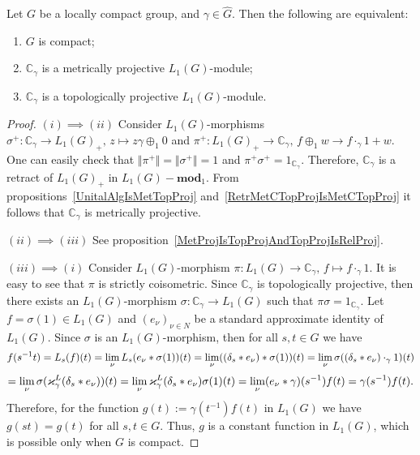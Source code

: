 \begin{proposition}\label{OneDimL1ModMetTopProjCharac} Let $G$ be a locally 
compact group, and $\gamma\in\widehat{G}$. Then the following are equivalent:

\begin{enumerate}[label = (\roman*)]
    \item $G$ is compact;

    \item $\mathbb{C}_\gamma$ is a metrically projective $L_1(G)$-module;

    \item $\mathbb{C}_\gamma$ is a topologically projective $L_1(G)$-module.
\end{enumerate}
\end{proposition}
\begin{proof} $(i)\implies (ii)$ Consider $L_1(G)$-morphisms 
$\sigma^+:\mathbb{C}_\gamma\to {L_1(G)}_+,\, z\mapsto z\gamma \oplus_1 0$ 
and $\pi^+:{L_1(G)}_+\to\mathbb{C}_\gamma,\, f\oplus_1 w\to f\cdot_{\gamma}1+w$. 
One can easily check 
that $\Vert\pi^+\Vert=\Vert\sigma^+\Vert=1$ 
and $\pi^+\sigma^+=1_{\mathbb{C}_\gamma}$. Therefore, $\mathbb{C}_\gamma$ is a 
retract of ${L_1(G)}_+$ in $L_1(G)-\mathbf{mod}_1$. From 
propositions~\ref{UnitalAlgIsMetTopProj} 
and~\ref{RetrMetCTopProjIsMetCTopProj} it follows 
that $\mathbb{C}_\gamma$ is metrically projective.

$(ii)\implies (iii)$ See
proposition~\ref{MetProjIsTopProjAndTopProjIsRelProj}.

$(iii)\implies (i)$ Consider $L_1(G)$-morphism
$\pi:L_1(G)\to\mathbb{C}_\gamma,\, f\mapsto f\cdot_{\gamma} 1$. It is easy to see
that $\pi$ is strictly coisometric. Since $\mathbb{C}_\gamma$ is topologically
projective, then there exists an $L_1(G)$-morphism $\sigma:\mathbb{C}_\gamma\to
L_1(G)$ such that $\pi\sigma=1_{\mathbb{C}_\gamma}$. Let $f=\sigma(1)\in L_1(G)$
and ${(e_\nu)}_{\nu\in N}$ be a standard approximate identity of $L_1(G)$. Since
$\sigma$ is an $L_1(G)$-morphism, then for all $s,t\in G$ we have 
$$
f(s^{-1}t)
=L_s(f)(t)
=\lim_\nu L_s(e_\nu\ast \sigma(1))(t)
=\lim_\nu((\delta_s\ast e_\nu)\ast \sigma(1))(t)
=\lim_\nu\sigma((\delta_s\ast e_\nu)\cdot_{\gamma} 1)(t)
$$
$$
=\lim_\nu\sigma(\varkappa_\gamma^L(\delta_s\ast e_\nu))(t)
=\lim_\nu\varkappa_\gamma^L(\delta_s\ast e_\nu)\sigma(1)(t)
=\lim_\nu(e_\nu\ast\gamma)(s^{-1})f(t)
=\gamma(s^{-1})f(t).
$$
Therefore, for the function $g(t):=\gamma(t^{-1})f(t)$ in $L_1(G)$ we have
$g(st)=g(t)$ for all $s,t\in G$. Thus, $g$ is a constant function in $L_1(G)$,
which is possible only when $G$ is compact.
\end{proof}

